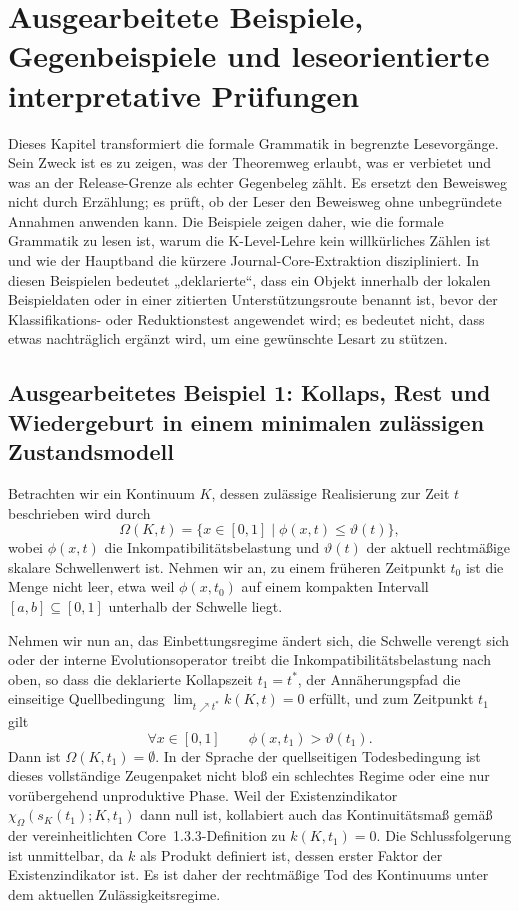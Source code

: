 \section{Ausgearbeitete Beispiele, Gegenbeispiele und leseorientierte interpretative Prüfungen}
\label{sec:oc13-worked-examples}

Dieses Kapitel transformiert die formale Grammatik in begrenzte Lesevorgänge. Sein Zweck ist es zu zeigen, was der Theoremweg erlaubt, was er verbietet und was an der Release-Grenze als echter Gegenbeleg zählt. Es ersetzt den Beweisweg nicht durch Erzählung; es prüft, ob der Leser den Beweisweg ohne unbegründete Annahmen anwenden kann. Die Beispiele zeigen daher, wie die formale Grammatik zu lesen ist, warum die K-Level-Lehre kein willkürliches Zählen ist und wie der Hauptband die kürzere Journal-Core-Extraktion diszipliniert.
In diesen Beispielen bedeutet „deklarierte“, dass ein Objekt innerhalb der lokalen Beispieldaten oder in einer zitierten Unterstützungsroute benannt ist, bevor der Klassifikations- oder Reduktionstest angewendet wird; es bedeutet nicht, dass etwas nachträglich ergänzt wird, um eine gewünschte Lesart zu stützen.

\subsection{Ausgearbeitetes Beispiel 1: Kollaps, Rest und Wiedergeburt in einem minimalen zulässigen Zustandsmodell}

Betrachten wir ein Kontinuum \(K\), dessen zulässige Realisierung zur Zeit \(t\) beschrieben wird durch
\[
\Omega(K,t) = \{x \in [0,1] \mid \phi(x,t) \le \vartheta(t)\},
\]
wobei \(\phi(x,t)\) die Inkompatibilitätsbelastung und \(\vartheta(t)\) der aktuell rechtmäßige skalare
Schwellenwert ist. Nehmen wir an, zu einem früheren Zeitpunkt \(t_0\) ist die Menge nicht leer, etwa weil
\(\phi(x,t_0)\) auf einem kompakten Intervall \([a,b]\subseteq [0,1]\) unterhalb der Schwelle liegt.

Nehmen wir nun an, das Einbettungsregime ändert sich, die Schwelle verengt sich oder der interne Evolutionsoperator treibt die Inkompatibilitätsbelastung nach oben, so dass die deklarierte Kollapszeit \(t_1=t^\ast\), der Annäherungspfad die einseitige Quellbedingung
\(\lim_{t\nearrow t^\ast} k(K,t)=0\) erfüllt, und zum Zeitpunkt \(t_1\) gilt
\[
\forall x \in [0,1] \qquad \phi(x,t_1) > \vartheta(t_1).
\]
Dann ist \(\Omega(K,t_1)=\emptyset\). In der Sprache der quellseitigen Todesbedingung ist dieses vollständige
Zeugenpaket nicht bloß ein schlechtes Regime oder eine nur vorübergehend unproduktive Phase. Weil der
Existenzindikator \(\chi_{\Omega}(s_K(t_1);K,t_1)\) dann null ist, kollabiert auch das
Kontinuitätsmaß gemäß der vereinheitlichten Core~1.3.3-Definition zu \(k(K,t_1)=0\). Die Schlussfolgerung ist
unmittelbar, da \(k\) als Produkt definiert ist, dessen erster Faktor der Existenzindikator ist. Es ist daher
der rechtmäßige Tod des Kontinuums unter dem aktuellen Zulässigkeitsregime.

